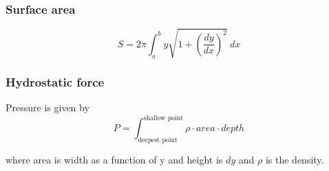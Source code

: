 \documentclass{article}
\begin{document}
\begin{multicols}{2}
\subsubsection*{Surface area}
\[
	S = 2\pi \int_a^b y \sqrt{1+\left( \frac{dy}{dx} \right)^2}\ dx
\]

\subsubsection*{Hydrostatic force}
Pressure is given by
\[
	P = \int_\text{deepest point}^\text{shallow point} \rho \cdot area \cdot depth
\]

where area is width as a function of y and height is $dy$ and $\rho$ is the density.

\end{multicols}
\end{document}
